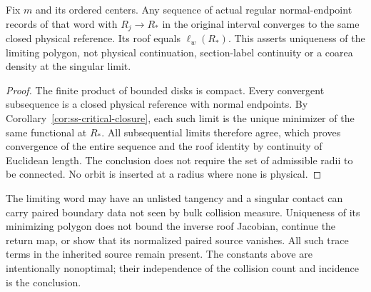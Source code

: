 \begin{corollary}
\label{cor:ss-compactification}
Fix $m$ and its ordered centers. Any sequence of actual regular
normal-endpoint records of that word with $R_j\to R_*$ in the
original interval converges to the same closed physical reference.
Its roof equals $\ell_w(R_*)$. This asserts uniqueness of the
limiting polygon, not physical continuation, section-label continuity
or a coarea density at the singular limit.
\end{corollary}
\begin{proof}
The finite product of bounded disks is compact. Every convergent
subsequence is a closed physical reference with normal endpoints.
By Corollary~\ref{cor:ss-critical-closure}, each such limit is the
unique minimizer of the same functional at $R_*$. All subsequential
limits therefore agree, which proves convergence of the entire
sequence and the roof identity by continuity of Euclidean length.
The conclusion does not require the set of admissible radii to be
connected. No orbit is inserted at a radius where none is physical.
\end{proof}

\begin{remark}
The limiting word may have an unlisted tangency and a singular contact
can carry paired boundary data not seen by bulk collision measure.
Uniqueness of its minimizing polygon does not bound the inverse roof
Jacobian, continue the return map, or show that its normalized paired
source vanishes. All such trace terms in the inherited source remain
present. The constants above are intentionally nonoptimal; their
independence of the collision count and incidence is the conclusion.
\end{remark}

